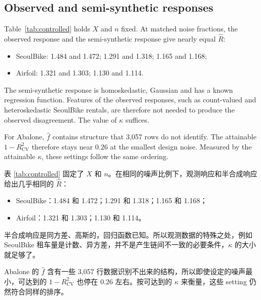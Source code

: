 \documentclass[11pt]{article}
\newcommand{\zhfont}{}
\newcommand{\Rhat}{\hat R}
\begin{document}
\subsection{Observed and semi-synthetic responses\quad{\zhfont 观测响应与半合成响应}}
Table~\ref{tab:controlled} holds $X$ and $n$ fixed. At matched noise fractions, the observed response and the semi-synthetic response give nearly equal $\Rhat$:
\begin{itemize}
\item SeoulBike: 1.484 and 1.472; 1.291 and 1.318; 1.165 and 1.168;
\item Airfoil: 1.321 and 1.303; 1.130 and 1.114.
\end{itemize}
The semi-synthetic response is homoskedastic, Gaussian and has a known regression function. Features of the observed responses, such as count-valued and heteroskedastic SeoulBike rentals, are therefore not needed to produce the observed disagreement. The value of $\kappa$ suffices.

For Abalone, $\hat f$ contains structure that 3,057 rows do not identify. The attainable $1-R^2_{\mathrm{CV}}$ therefore stays near 0.26 at the smallest design noise. Measured by the attainable $\kappa$, these settings follow the same ordering.

\begin{zhbox}
表 \ref{tab:controlled} 固定了 $X$ 和 $n$。在相同的噪声比例下，观测响应和半合成响应给出几乎相同的 $\Rhat$：
\begin{itemize}
\item SeoulBike：1.484 和 1.472；1.291 和 1.318；1.165 和 1.168；
\item Airfoil：1.321 和 1.303；1.130 和 1.114。
\end{itemize}
半合成响应是同方差、高斯的，回归函数已知。所以观测数据的特殊之处，例如 SeoulBike 租车量是计数、异方差，并不是产生链间不一致的必要条件，$\kappa$ 的大小就足够了。

Abalone 的 $\hat f$ 含有一些 3,057 行数据识别不出来的结构，所以即使设定的噪声最小，可达到的 $1-R^2_{\mathrm{CV}}$ 也停在 0.26 左右。按可达到的 $\kappa$ 来衡量，这些 setting 仍然符合同样的排序。
\end{zhbox}
\end{document}
